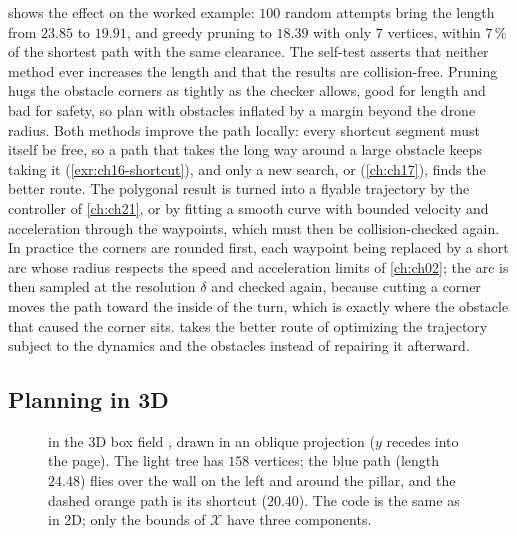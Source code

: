  shows the effect on the worked example: $100$
random attempts bring the length from $23.85$ to $19.91$, and greedy pruning
to $18.39$ with only $7$ vertices, within $7\,\%$ of the shortest path with
the same clearance. The self-test asserts that neither method ever increases
the length and that the results are collision-free. Pruning hugs the
obstacle corners as tightly as the checker allows, good for length and bad
for safety, so plan with obstacles inflated by a margin beyond the drone
radius. Both methods improve the path locally: every shortcut segment must
itself be free, so a path that takes the long way around a large obstacle
keeps taking it (\cref{exr:ch16-shortcut}), and only a new search, or
\rrtstar (\cref{ch:ch17}), finds the better route. The polygonal result is
turned into a flyable trajectory by the controller of \cref{ch:ch21}, or by
fitting a smooth curve with bounded velocity and acceleration through the
waypoints, which must then be collision-checked again. In practice the
corners are rounded first, each waypoint being replaced by a short arc whose
radius respects the speed and acceleration limits of \cref{ch:ch02}; the arc
is then sampled at the resolution $\delta$ and checked again, because
cutting a corner moves the path toward the inside of the turn, which is
exactly where the obstacle that caused the corner sits.  takes
the better route of optimizing the trajectory subject to the dynamics and
the obstacles instead of repairing it afterward.

\subsection{Planning in 3D}
\label{sec:ch16-3d}

\begin{figure}[!t]
  \centering
  \caption{\rrt in the 3D box field , drawn in an oblique
  projection ($y$ recedes into the page). The light tree has $158$ vertices;
  the blue path (length $24.48$) flies over the wall on the left and around
  the pillar, and the dashed orange path is its shortcut ($20.40$). The code
  is the same as in 2D; only the bounds of $\mathcal{X}$ have three
  components.}
  \label{fig:ch16-scene3d}
\end{figure}


